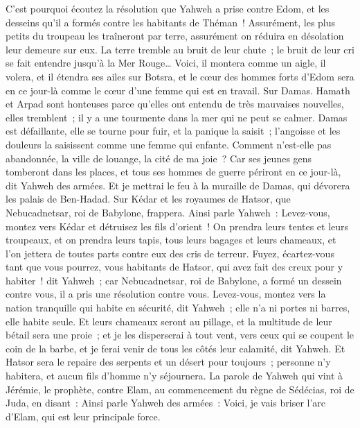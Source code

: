 \begin{multicols}{2}
C'est pourquoi écoutez la résolution que Yahweh a prise contre Edom, et les desseins qu'il a formés contre les habitants de Théman~! Assurément, les plus petits du troupeau les traîneront par terre, assurément on réduira en désolation leur demeure sur eux.
La terre tremble au bruit de leur chute~; le bruit de leur cri se fait entendre jusqu'à la Mer Rouge…
Voici, il montera comme un aigle, il volera, et il étendra ses ailes sur Botsra, et le cœur des hommes forts d'Edom sera en ce jour-là comme le cœur d'une femme qui est en travail.
Sur Damas. Hamath et Arpad sont honteuses parce qu'elles ont entendu de très mauvaises nouvelles, elles tremblent~; il y a une tourmente dans la mer qui ne peut se calmer.
Damas est défaillante, elle se tourne pour fuir, et la panique la saisit~; l'angoisse et les douleurs la saisissent comme une femme qui enfante.
Comment n'est-elle pas abandonnée, la ville de louange, la cité de ma joie~?
Car ses jeunes gens tomberont dans les places, et tous ses hommes de guerre périront en ce jour-là, dit Yahweh des armées.
Et je mettrai le feu à la muraille de Damas, qui dévorera les palais de Ben-Hadad.
Sur Kédar et les royaumes de Hatsor, que Nebucadnetsar, roi de Babylone, frappera. Ainsi parle Yahweh~: Levez-vous, montez vers Kédar et détruisez les fils d'orient~!
On prendra leurs tentes et leurs troupeaux, et on prendra leurs tapis, tous leurs bagages et leurs chameaux, et l'on jettera de toutes parts contre eux des cris de terreur.
Fuyez, écartez-vous tant que vous pourrez, vous habitants de Hatsor, qui avez fait des creux pour y habiter~! dit Yahweh~; car Nebucadnetsar, roi de Babylone, a formé un dessein contre vous, il a pris une résolution contre vous.
Levez-vous, montez vers la nation tranquille qui habite en sécurité, dit Yahweh~; elle n'a ni portes ni barres, elle habite seule.
Et leurs chameaux seront au pillage, et la multitude de leur bétail sera une proie~; et je les disperserai à tout vent, vers ceux qui se coupent le coin de la barbe, et je ferai venir de tous les côtés leur calamité, dit Yahweh.
Et Hatsor sera le repaire des serpents et un désert pour toujours~; personne n'y habitera, et aucun fils d'homme n'y séjournera.
La parole de Yahweh qui vint à Jérémie, le prophète, contre Elam, au commencement du règne de Sédécias, roi de Juda, en disant~:
Ainsi parle Yahweh des armées~: Voici, je vais briser l'arc d'Elam, qui est leur principale force.

\end{multicols}
